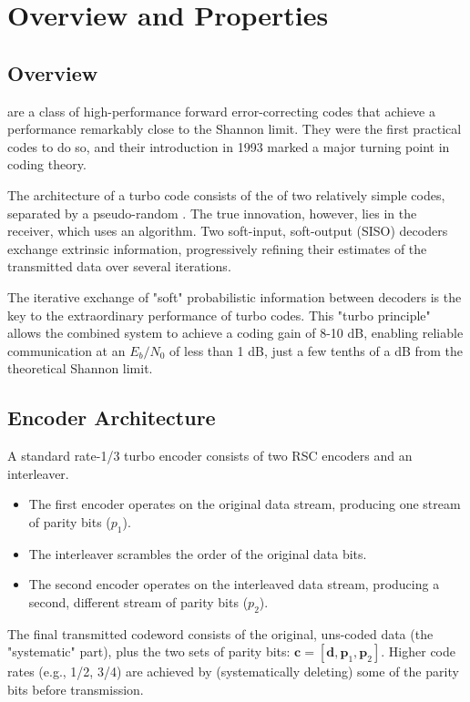 \section{Overview and Properties}

\subsection{Overview}

 are a class of high-performance forward error-correcting codes that achieve a performance remarkably close to the Shannon limit. They were the first practical codes to do so, and their introduction in 1993 marked a major turning point in coding theory.

The architecture of a turbo code consists of the  of two relatively simple  codes, separated by a pseudo-random . The true innovation, however, lies in the receiver, which uses an  algorithm. Two soft-input, soft-output (SISO) decoders exchange extrinsic information, progressively refining their estimates of the transmitted data over several iterations.

\begin{keyconcept}
    The iterative exchange of "soft" probabilistic information between decoders is the key to the extraordinary performance of turbo codes. This "turbo principle" allows the combined system to achieve a coding gain of 8-10 dB, enabling reliable communication at an $E_b/N_0$ of less than 1 dB, just a few tenths of a dB from the theoretical Shannon limit.
\end{keyconcept}


\subsection{Encoder Architecture}

A standard rate-1/3 turbo encoder consists of two RSC encoders and an interleaver.
\begin{itemize}
    \item The first encoder operates on the original data stream, producing one stream of parity bits ($p_1$).
    \item The interleaver scrambles the order of the original data bits.
    \item The second encoder operates on the interleaved data stream, producing a second, different stream of parity bits ($p_2$).
\end{itemize}
The final transmitted codeword consists of the original, uns-coded data (the "systematic" part), plus the two sets of parity bits: $\mathbf{c} = [\mathbf{d}, \mathbf{p}_1, \mathbf{p}_2]$. Higher code rates (e.g., 1/2, 3/4) are achieved by  (systematically deleting) some of the parity bits before transmission.


